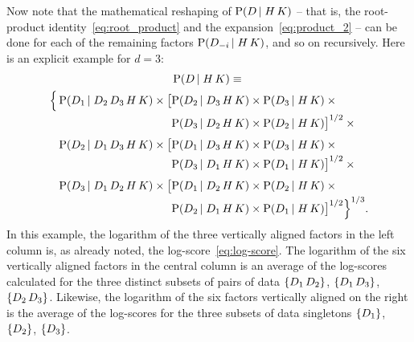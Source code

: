 \documentclass[\ifafour a4paper,12pt,\else a5paper,10pt,\fi%
onecolumn,oneside,article,%
british%
]{memoir}
\theoremstyle{remark}
\theoremstyle{innote}
\DeclarePairedDelimiter\set{\{}{\}}
\newcommand*{\p}{\mathrm{P}}%
\renewcommand*{\|}[1][]{\nonscript\,#1\vert\nonscript\;\mathopen{}}
\newcommand*{\yK}{K}
\begin{document}
Now note that the mathematical reshaping of $\p(D \| H \, \yK)$ -- that is, the
root-product identity~\eqref{eq:root_product} and the
expansion~\eqref{eq:product_2} -- can be done for each of the remaining factors
$\p(D_{-i} \| H \, \yK)$, and so on recursively. Here is an explicit
example for $d=3$:
\begin{multline}
  \label{eq:example_further_expansion}
  \p(D \| H \, \yK) \equiv{}\\
  \begin{alignedat}{2}
    \Bigl\{\,&\p(D_{1} \| D_{2} \,D_{3} \, H \, \yK) \times
    \bigl[ &&\p(D_{2} \| D_{3} \, H \, \yK) \times \p( D_{3} \| H \, \yK) \times{}\\[-0.5\jot]
    &&&\p(D_{3} \| D_{2} \, H \, \yK) \times \p( D_{2} \| H \, \yK)
    \bigr]^{1/2}\times{}\\[\jot]
    &\p(D_{2} \| D_{1} \,D_{3} \, H \, \yK) \times
    \bigl[&&\p(D_{1} \| D_{3} \, H \, \yK) \times \p( D_{3} \| H \, \yK) \times{}\\[-0.5\jot]
    &&&\p(D_{3} \| D_{1} \, H \, \yK) \times \p( D_{1} \| H \, \yK)
    \bigr]^{1/2}\times{}\\[\jot]
    &\p(D_{3} \| D_{1} \,D_{2} \, H \, \yK) \times
    \bigl[&&\p(D_{1} \| D_{2} \, H \, \yK) \times \p( D_{2} \| H \, \yK) \times{}\\[-0.5\jot]
    &&&\p(D_{2} \| D_{1} \, H \, \yK) \times \p( D_{1} \| H \, \yK)
    \bigr]^{1/2}\Bigr\}^{1/3}.
  \end{alignedat}
\end{multline}
In this example, the logarithm of the three vertically aligned factors in
the left column is, as already noted, the log-score~\eqref{eq:log-score}.
The logarithm of the six vertically aligned factors in the central column
is an average of the log-scores calculated for the three distinct subsets
of pairs of data $\set{D_{1}\,D_{2}}$, $\set{D_{1}\, D_{3}}$,
$\set{D_{2}\, D_{3}}$. Likewise, the logarithm of the six factors
vertically aligned on the right is the average of the log-scores for the
three subsets of data singletons $\set{D_{1}}$, $\set{D_{2}}$,
$\set{D_{3}}$.
\end{document}
